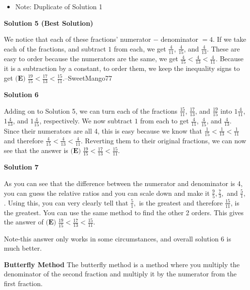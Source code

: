 \begin{enumerate}
 
            \begin{itemize}
        \item Note: Duplicate of Solution 1
            \end{itemize}
            



\textbf{Solution 5 (Best Solution)}

We notice that each of these fractions' numerator $-$ denominator $=4$. If we take each of the fractions, and subtract $1$ from each, we get $\frac{4}{11}$, $\frac{4}{15}$, and $\frac{4}{13}$. These are easy to order because the numerators are the same, we get $\frac{4}{15}<\frac{4}{13}<\frac{4}{11}$. Because it is a subtraction by a constant, to order them, we keep the inequality signs to get $\boxed{\textbf{(E)}\;\frac{19}{15}<\frac{17}{13}<\frac{15}{11}}$.--SweetMango77

 



\textbf{Solution 6}

Adding on to Solution 5, we can turn each of the fractions $\frac{15}{11}$, $\frac{17}{13}$, and $\frac{19}{15}$ into $1$$\frac{4}{11}$, $1$$\frac{4}{13}$, and $1$$\frac{4}{15}$, respectively. We now subtract $1$ from each to get $\frac{4}{11}$, $\frac{4}{15}$, and $\frac{4}{13}$. Since their numerators are all 4, this is easy because we know that $\frac{1}{15}<\frac{1}{13}<\frac{1}{11}$ and therefore $\frac{4}{15}<\frac{4}{13}<\frac{4}{11}$. Reverting them to their original fractions, we can now see that the answer is $\boxed{\textbf{(E)}\;\frac{19}{15}<\frac{17}{13}<\frac{15}{11}}$.

 



\textbf{Solution 7}

As you can see that the difference between the numerator and denominator is 4, you can guess the relative ratios and you can scale down and make it $\frac{9}{5},\frac{7}{3},$ and $\frac{5}{1},$. Using this, you can very clearly tell that $\frac{5}{1},$ is the greatest and therefore $\frac{15}{11}$, is the greatest. You can use the same method to find the other 2 orders. This gives the answer of $\boxed{\textbf{(E)}\;\frac{19}{15}<\frac{17}{13}<\frac{15}{11}}$.

 Note-this answer only works in some circumstances, and overall solution 6 is much better.

 \textbf{Butterfly Method} The butterfly method is a method where you multiply the denominator of the second fraction and multiply it by the numerator from the first fraction.


\end{enumerate}
